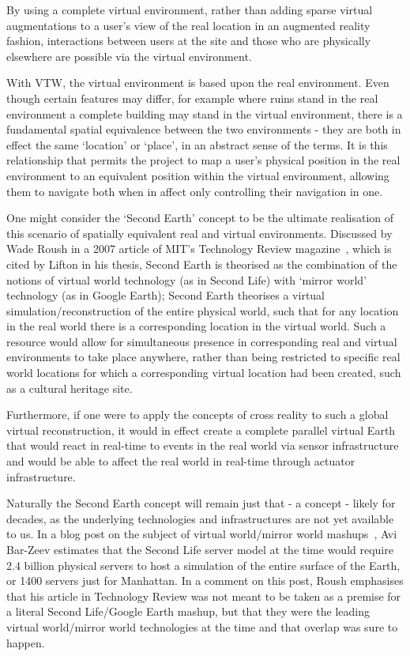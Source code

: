 By using a complete virtual environment, rather than adding sparse virtual augmentations to a user's view of the real location in an augmented reality fashion, interactions between users at the site and those who are physically elsewhere are possible via the virtual environment.

With VTW, the virtual environment is based upon the real environment. Even though certain features may differ, for example where ruins stand in the real environment a complete building may stand in the virtual environment, there is a fundamental spatial equivalence between the two environments - they are both in effect the same `location' or `place', in an abstract sense of the terms. It is this relationship that permits the project to map a user's physical position in the real environment to an equivalent position within the virtual environment, allowing them to navigate both when in affect only controlling their navigation in one.

One might consider the `Second Earth' concept to be the ultimate realisation of this scenario of spatially equivalent real and virtual environments. Discussed by Wade Roush in a 2007 article of MIT's Technology Review magazine~\cite{Roush2007}, which is cited by Lifton in his thesis, Second Earth is theorised as the combination of the notions of virtual world technology (as in Second Life) with `mirror world' technology (as in Google Earth); Second Earth theorises a virtual simulation/reconstruction of the entire physical world, such that for any location in the real world there is a corresponding location in the virtual world. Such a resource would allow for simultaneous presence in corresponding real and virtual environments to take place anywhere, rather than being restricted to specific real world locations for which a corresponding virtual location had been created, such as a cultural heritage site.

Furthermore, if one were to apply the concepts of cross reality to such a global virtual reconstruction, it would in effect create a complete parallel virtual Earth that would react in real-time to events in the real world via sensor infrastructure and would be able to affect the real world in real-time through actuator infrastructure.

Naturally the Second Earth concept will remain just that - a concept - likely for decades, as the underlying technologies and infrastructures are not yet available to us. In a blog post on the subject of virtual world/mirror world mashups~\cite{Bar-Zeev2007}, Avi Bar-Zeev estimates that the Second Life server model at the time would require 2.4 billion physical servers to host a simulation of the entire surface of the Earth, or 1400 servers just for Manhattan. In a comment on this post, Roush emphasises that his article in Technology Review was not meant to be taken as a premise for a literal Second Life/Google Earth mashup, but that they were the leading virtual world/mirror world technologies at the time and that overlap was sure to happen.

